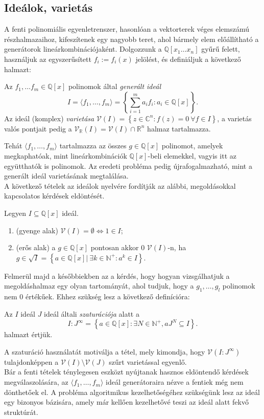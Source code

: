 \documentclass[12pt,a4paper,oneside]{report}
\newcommand{\C}{\mathbb{C}}
\newcommand{\Real}{\mathbb{R}}
\newcommand{\N}{\mathbb{N}}
\newcommand{\V}{\mathcal{V}}
\newcommand{\Qrac}{\mathbb{Q}}
\newcommand{\Qring}{\mathbb{Q}[x]}
\newcommand{\fideal}{\langle f_1,\dots,f_m\rangle}
\begin{document}
\subsection{Ideálok, varietás}
A fenti polinomiális egyenletrenszer, hasonlóan a vektorterek véges elemszámú részhalmazaihoz, kifeszítenek egy nagyobb teret, ahol bármely elem előállítható a generátorok lineárkombinációjaként. Dolgozzunk a $\Qrac[x_1\dots x_n]$ gyűrű felett, használjuk az egyszerűsített $f_i:=f_i(x)$ jelölést, és definiáljuk a következő halmazt:
\begin{definicio}[Ideál]
    Az $f_1,\dots f_m\in\Qring$ polinomok által \textit{generált ideál}
    \begin{equation}\label{eq:ideal_def}
        I=\langle f_1,\dots,f_m\rangle=\left\{\sum_{i=1}^m a_if_i:a_i\in\Qring\right\}.
    \end{equation}
    Az ideál (komplex) \textit{varietása} $\mathcal{V}(I)=\left\{z\in\C^n:f(z)=0\ \forall f\in I\right\}$, a varietás valós pontjait pedig a $\V_\Real(I)=\V(I)\cap\Real^n$ halmaz tartalmazza.
\end{definicio}
Tehát $\fideal$ tartalmazza az összes $g\in\Qring$ polinomot, amelyek megkaphatóak, mint lineárkombinációk $\Qring$-beli elemekkel, vagyis itt az együtthatók is polinomok. Az eredeti probléma pedig újrafogalmazható, mint a generált ideál varietásának megtalálása.\\
A következő tételek az ideálok nyelvére fordítják az alábbi, megoldásokkal kapcsolatos kérdések eldöntését.
\begin{tetel}\label{the:nullstellensatz}
    Legyen $I\subseteq \Qring$ ideál.
    \begin{enumerate}
        \item (gyenge alak) $\V(I)=\emptyset \iff 1\in I$;
        \item (erős alak) a $g\in\Qring$ pontosan akkor 0 $\V(I)$-n, ha $g\in\sqrt{I}=\left\{a\in \Qring\Big|\ \exists k\in\N^+:a^k\in I\right\}$.
    \end{enumerate}
\end{tetel}
Felmerül majd a későbbiekben az a kérdés, hogy hogyan vizsgálhatjuk a megoldáshalmaz egy olyan tartományát, ahol tudjuk, hogy a $g_1,\dots,g_l$ polinomok nem 0 értékűek. Ehhez szükség lesz a következő definícióra:
\begin{definicio}[Szaturáció]\label{def:saturation}
    Az $I$ ideál $J$ ideál általi \textit{szaturációja} alatt a 
    \begin{equation}
        I:J^{\infty}=\left\{a\in\Qring: \exists N\in \N^+, aJ^N\subseteq I\right\}.
    \end{equation}
    halmazt értjük.
\end{definicio}
A szaturáció használatát motiválja a tétel, mely kimondja, hogy $\V(I:J^\infty)$ tulajdonképpen a $\V(I)\setminus\V(J)$ szűrt varietással egyenlő. \\
Bár a fenti tételek ténylegesen eszközt nyújtanak hasznos eldöntendő kérdések megválaszolására, az $\fideal$ ideál generátoraira nézve a fentiek még nem dönthetőek el. A probléma algoritmikus kezelhetőségéhez szükségünk lesz az ideál egy bizonyos bázisára, amely már kellően kezelhetővé teszi az ideál alatt fekvő struktúrát.
\end{document}
